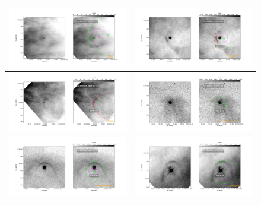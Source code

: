 \begin{figure}[htp]
\begin{tabular}{|l|l|}
    \includegraphics[width=0.47\linewidth,  trim=60 50 100 50, clip]{j8oc09010_wcs/072-134-Bally_09-images.pdf}
    &\includegraphics[width=0.47\linewidth,  trim=60 50 100 50, clip]{j8oc09010_wcs/4578-251-Bally_09-images.pdf}\\ \hline
    \includegraphics[width=0.47\linewidth,  trim=60 50 100 50, clip]{j8oc09010_wcs/w000-400-Bally_09-images.pdf}
    &\includegraphics[width=0.47\linewidth,  trim=60 50 100 50, clip]{j8oc14010_wcs/066-3251-Bally_14-images.pdf}\\ \hline
    \includegraphics[width=0.47\linewidth,  trim=60 50 100 50, clip]{j8oc14010_wcs/116-3101-Bally_14-images.pdf}
   &\includegraphics[width=0.47\linewidth,  trim=60 50 100 50, clip]{j8oc14010_wcs/119-3155-Bally_14-images.pdf}\\ \hline
 \end{tabular}
\end{figure}


